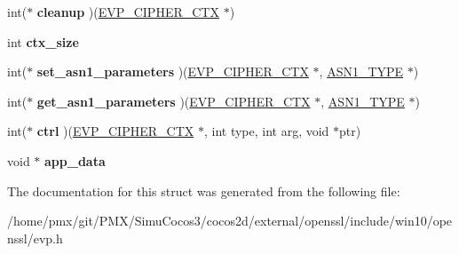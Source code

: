 \begin{DoxyCompactItemize}
int($\ast$ {\bfseries cleanup} )(\hyperlink{structevp__cipher__ctx__st}{E\+V\+P\+\_\+\+C\+I\+P\+H\+E\+R\+\_\+\+C\+TX} $\ast$)
\item 
\mbox{\label{structevp__cipher__st_a856751b3bf79b35b6178f574dea3d1bc}} 
int {\bfseries ctx\+\_\+size}
\item 
\mbox{\label{structevp__cipher__st_aca59cfca681fefba705b0c58f9956e9b}} 
int($\ast$ {\bfseries set\+\_\+asn1\+\_\+parameters} )(\hyperlink{structevp__cipher__ctx__st}{E\+V\+P\+\_\+\+C\+I\+P\+H\+E\+R\+\_\+\+C\+TX} $\ast$, \hyperlink{structasn1__type__st}{A\+S\+N1\+\_\+\+T\+Y\+PE} $\ast$)
\item 
\mbox{\label{structevp__cipher__st_a438856068bda2e643c3e1a713d77ad66}} 
int($\ast$ {\bfseries get\+\_\+asn1\+\_\+parameters} )(\hyperlink{structevp__cipher__ctx__st}{E\+V\+P\+\_\+\+C\+I\+P\+H\+E\+R\+\_\+\+C\+TX} $\ast$, \hyperlink{structasn1__type__st}{A\+S\+N1\+\_\+\+T\+Y\+PE} $\ast$)
\item 
\mbox{\label{structevp__cipher__st_a7f3ad30b0b90b5740b831b9e7aa43cbe}} 
int($\ast$ {\bfseries ctrl} )(\hyperlink{structevp__cipher__ctx__st}{E\+V\+P\+\_\+\+C\+I\+P\+H\+E\+R\+\_\+\+C\+TX} $\ast$, int type, int arg, void $\ast$ptr)
\item 
\mbox{\label{structevp__cipher__st_a11371711dc0f64bacf01b3ad72cf90f3}} 
void $\ast$ {\bfseries app\+\_\+data}
\end{DoxyCompactItemize}


The documentation for this struct was generated from the following file\+:\begin{DoxyCompactItemize}
\item 
/home/pmx/git/\+P\+M\+X/\+Simu\+Cocos3/cocos2d/external/openssl/include/win10/openssl/evp.\+h\end{DoxyCompactItemize}

